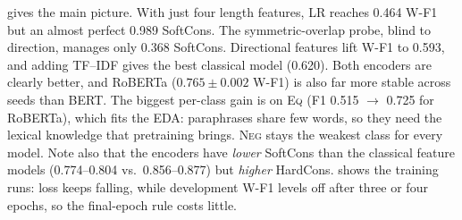 \documentclass[11pt,a4paper]{article}
\newcommand{\EQ}{\textsc{Eq}}
\newcommand{\NEG}{\textsc{Neg}}
\begin{document}
\begin{table}[t]
\centering
\small
{}
\caption{Development-set results with the official scorer. W-F1, SoftCons and HardCons are the official metrics.}
\label{tab:results}
\end{table}

 gives the main picture. With just four length features, LR reaches 0.464 W-F1 but an almost perfect 0.989 SoftCons. The symmetric-overlap probe, blind to direction, manages only 0.368 SoftCons. Directional features lift W-F1 to 0.593, and adding TF--IDF gives the best classical model (0.620). Both encoders are clearly better, and RoBERTa ($0.765\pm0.002$ W-F1) is also far more stable across seeds than BERT. The biggest per-class gain is on \EQ{} (F1 0.515 $\rightarrow$ 0.725 for RoBERTa), which fits the EDA: paraphrases share few words, so they need the lexical knowledge that pretraining brings. \NEG{} stays the weakest class for every model. Note also that the encoders have \emph{lower} SoftCons than the classical feature models (0.774--0.804 vs.\ 0.856--0.877) but \emph{higher} HardCons.  shows the training runs: loss keeps falling, while development W-F1 levels off after three or four epochs, so the final-epoch rule costs little.
\end{document}
